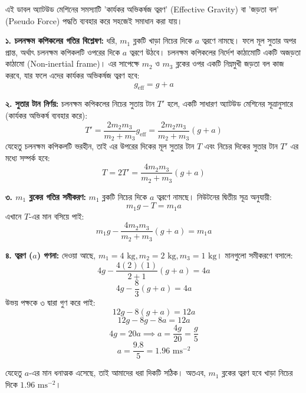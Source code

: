 \documentclass[12pt, a4paper]{article}
\begin{document}
\begin{tcolorbox}[solutionbox={সমাধান (Solution)}]
\noindent
এই ডাবল অ্যাটউড মেশিনের সমস্যাটি 'কার্যকর অভিকর্ষজ ত্বরণ' (Effective Gravity) বা 'জড়তা বল' (Pseudo Force) পদ্ধতি ব্যবহার করে সহজেই সমাধান করা যায়। 

\vspace{0.5em}
\textbf{১. চলনক্ষম কপিকলের গতির বিশ্লেষণ:}
ধরি, $m_1$ ব্লকটি খাড়া নিচের দিকে $a$ ত্বরণে নামছে। ফলে মূল সুতার অপর প্রান্ত, অর্থাৎ চলনক্ষম কপিকলটি ওপরের দিকে $a$ ত্বরণে উঠবে। 
চলনক্ষম কপিকলের নির্দেশ কাঠামোটি একটি অজড়তা কাঠামো (Non-inertial frame)। এর সাপেক্ষে $m_2$ ও $m_3$ ব্লকের ওপর একটি নিম্নমুখী জড়তা বল কাজ করবে, যার ফলে এদের কার্যকর অভিকর্ষজ ত্বরণ হবে:
$$g_{\text{eff}} = g + a$$

\vspace{0.5em}
\textbf{২. সুতার টান নির্ণয়:}
চলনক্ষম কপিকলের নিচের সুতায় টান $T'$ হলে, একটি সাধারণ অ্যাটউড মেশিনের সূত্রানুসারে (কার্যকর অভিকর্ষ ব্যবহার করে):
$$T' = \frac{2 m_2 m_3}{m_2 + m_3} g_{\text{eff}} = \frac{2 m_2 m_3}{m_2 + m_3} (g + a)$$
যেহেতু চলনক্ষম কপিকলটি ভরহীন, তাই এর উপরের দিকের মূল সুতার টান $T$ এবং নিচের দিকের সুতার টান $T'$ এর মধ্যে সম্পর্ক হবে:
$$T = 2T' = \frac{4 m_2 m_3}{m_2 + m_3} (g + a)$$

\vspace{0.5em}
\textbf{৩. $m_1$ ব্লকের গতির সমীকরণ:}
$m_1$ ব্লকটি নিচের দিকে $a$ ত্বরণে নামছে। নিউটনের দ্বিতীয় সূত্র অনুযায়ী:
$$m_1 g - T = m_1 a$$
এখানে $T$-এর মান বসিয়ে পাই:
$$m_1 g - \frac{4 m_2 m_3}{m_2 + m_3} (g + a) = m_1 a$$

\vspace{0.5em}
\textbf{৪. ত্বরণ ($a$) গণনা:}
দেওয়া আছে, $m_1 = 4\text{ kg}, m_2 = 2\text{ kg}, m_3 = 1\text{ kg}$। মানগুলো সমীকরণে বসালে:
$$4g - \frac{4(2)(1)}{2 + 1} (g + a) = 4a$$
$$4g - \frac{8}{3}(g + a) = 4a$$
উভয় পক্ষকে ৩ দ্বারা গুণ করে পাই:
$$12g - 8(g + a) = 12a$$
$$12g - 8g - 8a = 12a$$
$$4g = 20a \implies a = \frac{4g}{20} = \frac{g}{5}$$
$$a = \frac{9.8}{5} = 1.96\text{ ms}^{-2}$$

যেহেতু $a$-এর মান ধনাত্মক এসেছে, তাই আমাদের ধরা দিকটি সঠিক। অতএব, $m_1$ ব্লকের ত্বরণ হবে খাড়া নিচের দিকে $1.96\text{ ms}^{-2}$।
\end{tcolorbox}
\vspace{1em}
\end{document}
